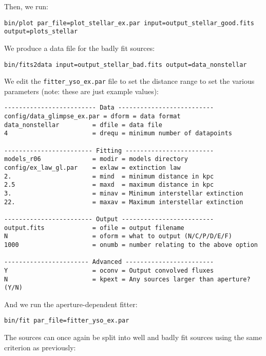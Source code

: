 \documentclass[letterpaper,11pt]{report}
\begin{document}
Then, we run:

\begin{verbatim}
bin/plot par_file=plot_stellar_ex.par input=output_stellar_good.fits output=plots_stellar
\end{verbatim}

We produce a data file for the badly fit sources:

\begin{verbatim}
bin/fits2data input=output_stellar_bad.fits output=data_nonstellar
\end{verbatim}

We edit the \texttt{fitter\_yso\_ex.par} file to set the distance range to set the various parameters (note: these are just example values):

\begin{scriptsize}
\begin{Verbatim}[frame=single,framesep=5mm,boxwidth=auto]
------------------------- Data --------------------------
config/data_glimpse_ex.par = dform = data format
data_nonstellar         = dfile = data file
4                       = drequ = minimum number of datapoints

------------------------ Fitting ------------------------
models_r06              = modir = models directory
config/ex_law_gl.par    = exlaw = extinction law
2.                      = mind  = minimum distance in kpc
2.5                     = maxd  = maximum distance in kpc
3.                      = minav = Minimum interstellar extinction
22.                     = maxav = Maximum interstellar extinction

------------------------ Output -------------------------
output.fits             = ofile = output filename
N                       = oform = what to output (N/C/P/D/E/F)
1000                    = onumb = number relating to the above option

----------------------- Advanced ------------------------
Y                       = oconv = Output convolved fluxes
N                       = kpext = Any sources larger than aperture? (Y/N)
\end{Verbatim}
\end{scriptsize}

And we run the aperture-dependent fitter:

\begin{verbatim}
bin/fit par_file=fitter_yso_ex.par
\end{verbatim}

The sources can once again be split into well and badly fit sources using the same criterion as previously:
\end{document}
